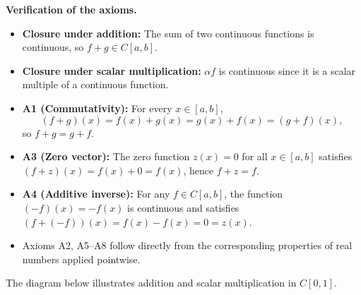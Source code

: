 \documentclass[12pt,a4paper]{article}
\begin{document}
\noindent
\textbf{Verification of the axioms.}

\begin{itemize}[leftmargin=2em, itemsep=0.4em]
  \item \textbf{Closure under addition:} The sum of two continuous functions is
        continuous, so $f+g \in C[a,b]$.
  \item \textbf{Closure under scalar multiplication:} $\alpha f$ is continuous
        since it is a scalar multiple of a continuous function.
  \item \textbf{A1 (Commutativity):} For every $x\in[a,b]$,
        \[
          (f+g)(x) = f(x)+g(x) = g(x)+f(x) = (g+f)(x),
        \]
        so $f+g = g+f$.
  \item \textbf{A3 (Zero vector):} The zero function $z(x)=0$ for all
        $x\in[a,b]$ satisfies $(f+z)(x) = f(x)+0 = f(x)$, hence $f+z=f$.
  \item \textbf{A4 (Additive inverse):} For any $f\in C[a,b]$, the function
        $(-f)(x) = -f(x)$ is continuous and satisfies
        $(f + (-f))(x) = f(x) - f(x) = 0 = z(x)$.
  \item Axioms A2, A5--A8 follow directly from the corresponding properties
        of real numbers applied pointwise.
\end{itemize}

\noindent
The diagram below illustrates addition and scalar multiplication in $C[0,1]$.
\end{document}
